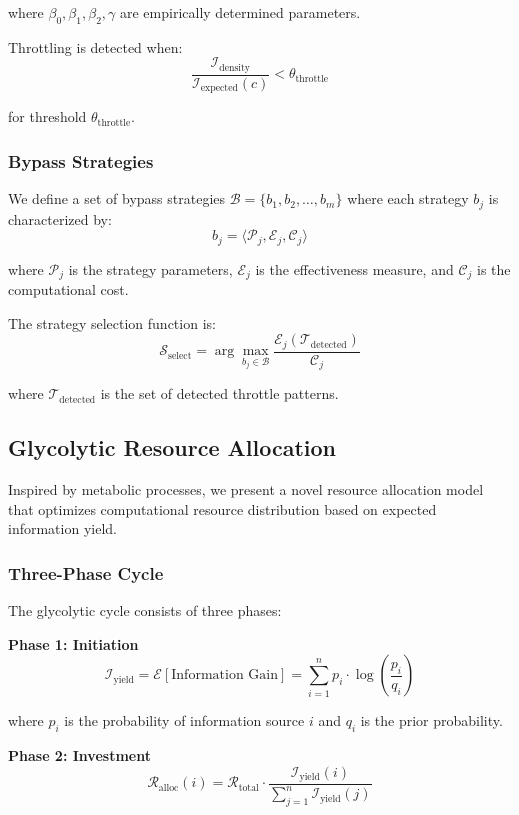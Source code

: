 \documentclass[12pt,a4paper]{article}
\begin{document}
where $\beta_0, \beta_1, \beta_2, \gamma$ are empirically determined parameters.

Throttling is detected when:
$$\frac{\mathcal{I}_{\text{density}}}{\mathcal{I}_{\text{expected}}(c)} < \theta_{\text{throttle}}$$

for threshold $\theta_{\text{throttle}}$.

\subsubsection{Bypass Strategies}

We define a set of bypass strategies $\mathcal{B} = \{b_1, b_2, \ldots, b_m\}$ where each strategy $b_j$ is characterized by:
$$b_j = \langle \mathcal{P}_j, \mathcal{E}_j, \mathcal{C}_j \rangle$$

where $\mathcal{P}_j$ is the strategy parameters, $\mathcal{E}_j$ is the effectiveness measure, and $\mathcal{C}_j$ is the computational cost.

The strategy selection function is:
$$\mathcal{S}_{\text{select}} = \arg\max_{b_j \in \mathcal{B}} \frac{\mathcal{E}_j(\mathcal{T}_{\text{detected}})}{\mathcal{C}_j}$$

where $\mathcal{T}_{\text{detected}}$ is the set of detected throttle patterns.

\subsection{Glycolytic Resource Allocation}

Inspired by metabolic processes, we present a novel resource allocation model that optimizes computational resource distribution based on expected information yield.

\subsubsection{Three-Phase Cycle}

The glycolytic cycle consists of three phases:

\textbf{Phase 1: Initiation}
$$\mathcal{I}_{\text{yield}} = \mathcal{E}[\text{Information Gain}] = \sum_{i=1}^{n} p_i \cdot \log\left(\frac{p_i}{q_i}\right)$$

where $p_i$ is the probability of information source $i$ and $q_i$ is the prior probability.

\textbf{Phase 2: Investment}
$$\mathcal{R}_{\text{alloc}}(i) = \mathcal{R}_{\text{total}} \cdot \frac{\mathcal{I}_{\text{yield}}(i)}{\sum_{j=1}^{n} \mathcal{I}_{\text{yield}}(j)}$$
\end{document}
